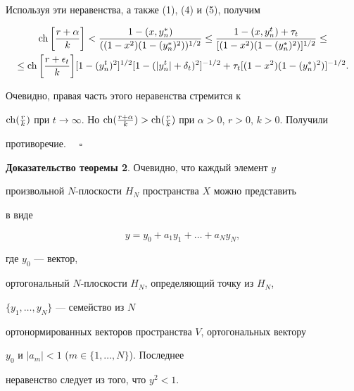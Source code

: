 Используя эти неравенства, а также (1), (4) и (5), получим


\begin{multline}


\ch\bigg[\frac{r + \alpha}{k}\bigg] < \frac{1- (x,y^{*}_{n})}


{((1 -x^{2})(1 - (y^{*}_{n})^{2}))^{ 1/2}}


\leq \frac{1- (x,y^{t}_{n}) + \tau_{t}}


{[(1 -x^{2})(1 - (y^{*}_{n})^{2})]^{ 1/2}} \le \\


%


\leq 


\ch\bigg[\frac{r + \epsilon_{t}}{k}\bigg][1 - (y^{t}_{n})^{2}]^{1/2}


[1 - (|y^{t}_{n}| +


\delta_{t})^{2}]^{- 1/2} + \tau_{t} [(1 -x^{2})(1 - (y^{*}_{n})^{2})]^{-


1/2}.


\end{multline}


Очевидно, правая часть этого неравенства стремится к


$\ch(\frac{r}{k})$ при $t \to \infty$. Но $\ch(\frac{r + \alpha}{k}) > 


\ch(\frac{r}{k})$ при $\alpha > 0$, $r > 0$, $k > 0$. Получили


противоречие. $\quad\square$


\medskip


 


{\bf Доказательство теоремы 2}. Очевидно, что каждый элемент $y$


произвольной $N$-плоскости $H_{N}$ пространства $X$ можно представить


в виде


$$


y = y_{0} + a_{1}y_{1} + \dotsc +a_{N}y_{N},


$$


где $y_{0}$ --- вектор,


ортогональный $N$-плоскости $H_{N}$, определяющий точку из $H_{N}$,


$\{y_{1}, \dotsc,y_{N}\}$ --- семейство из $N$


ортонормированных векторов пространства $V$, ортогональных вектору


$y_{0}$ и $|a_{m}| < 1$ ($m \in \{1, \dotsc,N\}$). Последнее


неравенство следует из того, что $y^{2} < 1$.


